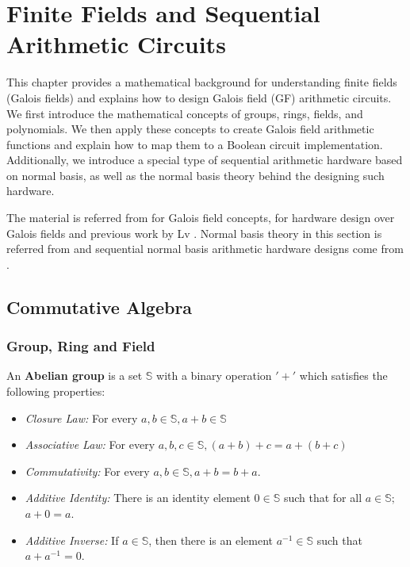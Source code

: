 \chapter{Finite Fields and Sequential Arithmetic Circuits}
\label{ch:prelim_GF}
This chapter provides a mathematical background for understanding 
finite fields (Galois fields) and explains how to design Galois field (GF) arithmetic circuits.
We first introduce the mathematical concepts of groups, rings, fields, and 
polynomials. 
We then apply these concepts to create Galois field arithmetic functions and 
explain how to map them to a Boolean circuit implementation.
Additionally, we introduce a special type of sequential arithmetic hardware based on normal basis, as well
as the normal basis theory behind the designing such hardware.

The material is referred from \cite{galois_field:mceliece, ftheory:2006, ff:1997} for Galois field concepts, 
\cite{mastro:1989, PT:1985, acar:1998, wu:2002, Knezevic:2008} for hardware design over Galois fields 
and previous work by Lv \cite{lv:phd}.
Normal basis theory in this section is referred from \cite{normal_book, gao:phd_normal_basis} and sequential
normal basis arithmetic hardware designs come from \cite{mullinONB,MasseyOmura,agnew1991implementation, RHmulti}.

\section{Commutative Algebra}
\label{sec:algebra}
\subsection{Group, Ring and Field}
\begin{Definition}
An {\bf Abelian group} is a set $\mathbb{S}$ with a binary operation $'+'$
which satisfies the following properties: 
\begin{itemize}
\item {\it Closure Law:} For every $a, b \in \mathbb{S}, a + b \in \mathbb{S}$  
\item {\it Associative Law:} For every $a, b, c \in \mathbb{S}, (a + b) + c = a + (b + c)$
\item {\it Commutativity:} For every $a, b \in \mathbb{S}, a + b = b + a$. 
\item {\it Additive Identity:} There is an identity element $0 \in \mathbb{S}$
such that for all $a \in \mathbb{S};$ $a + 0 = a$.
\item {\it Additive Inverse:} If $a \in \mathbb{S}$, then there is an
element $a^{-1} \in \mathbb{S}$ such that $ a + a^{-1} = 0$.
\end{itemize}
\end{Definition}

